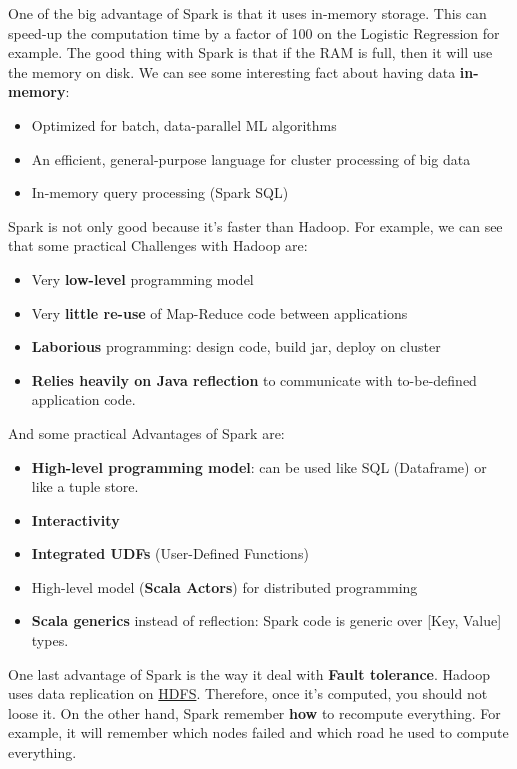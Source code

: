 One of the big advantage of Spark is that it uses in-memory storage. This can speed-up the computation time by a factor of 100 on the Logistic Regression for example. The good thing with Spark is that if the RAM is full, then it will use the memory on disk. We can see some interesting fact about having data {\bf in-memory}:
\begin{itemize}
 \item Optimized for batch, data-parallel ML algorithms
 \item An efficient, general-purpose language for cluster processing of big data
 \item In-memory query processing (Spark SQL)
\end{itemize}

Spark is not only good because it's faster than Hadoop. For example, we can see that some practical Challenges with Hadoop are:
\begin{itemize}
 \item Very {\bf low-level} programming model
 \item Very {\bf little re-use} of Map-Reduce code between applications
 \item {\bf Laborious} programming: design code, build jar, deploy on cluster
 \item {\bf Relies heavily on Java reflection} to communicate with to-be-defined application code.
\end{itemize}

And some practical Advantages of Spark are:
\begin{itemize}
 \item {\bf High-level programming model}: can be used like SQL (Dataframe) or like a tuple store.
 \item {\bf Interactivity}
 \item {\bf Integrated UDFs} (User-Defined Functions)
 \item High-level model ({\bf Scala Actors}) for distributed programming
 \item {\bf Scala generics} instead of reflection: Spark code is generic over [Key, Value] types.
\end{itemize}

One last advantage of Spark is the way it deal with {\bf Fault tolerance}. Hadoop uses data replication on \href{https://en.wikipedia.org/wiki/Apache\_Hadoop#HDFS}{HDFS}. Therefore, once it's computed, you should not loose it. On the other hand, Spark remember {\bf how} to recompute everything. For example, it will remember which nodes failed and which road he used to compute everything.

